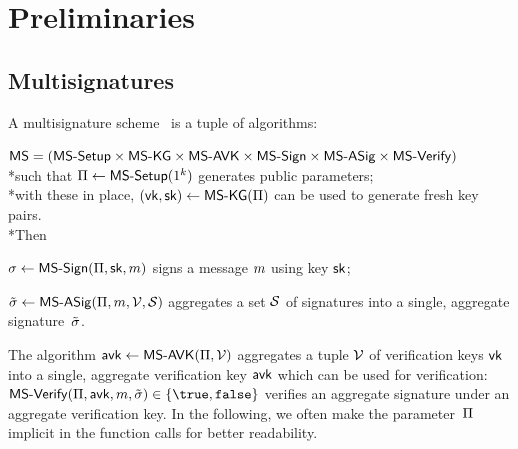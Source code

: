 \section{Preliminaries}\label{sec:prel}

\subsection{Multisignatures}\label{sec:multisig}
%
A multisignature scheme~\cite{itakura1983public,CCS:MicOhtRey01} is a
tuple of algorithms:

\vspace{5mm}$\mathsf{MS} = (\mathsf{MS\textsf{-}{}Setup} \times \allowbreak\mathsf{MS\textsf{-}{}KG} \times \allowbreak\mathsf{MS\textsf{-}{}AVK} \times \allowbreak
\mathsf{MS\textsf{-}{}Sign} \times \allowbreak\mathsf{MS\textsf{-}{}ASig} \times \allowbreak\mathsf{MS\textsf{-}{}Verify})$
\vspace{5mm}\\*such that
$\Pi \gets \mathsf{MS\textsf{-}{}Setup}(1^k)$ generates public parameters;
\\*with these in place,
$(\mathsf{vk},\mathsf{sk}) \gets \mathsf{MS\textsf{-}{}KG}(\Pi)$ can be used to generate
fresh key pairs. 
\vspace{5mm}\\*Then
\begin{mitemize}
  \item $\sigma \gets \mathsf{MS\textsf{-}{}Sign}(\Pi,\mathsf{sk},m)$ signs 
    a message $m$ using key $\mathsf{sk}$;
  \item $\tilde \sigma \gets \mathsf{MS\textsf{-}{}ASig}(\Pi,m,\mathcal V,\mathcal S)$ aggregates a
    set $\mathcal S$ of signatures into a single, aggregate signature~$\tilde \sigma$.
  \end{mitemize}
  The algorithm $\mathsf{avk} \gets \mathsf{MS\textsf{-}{}AVK}(\Pi,\mathcal V)$ aggregates
  a tuple $\mathcal V$ of verification keys $\mathsf{vk}$ into a single,
  aggregate verification key $\mathsf{avk}$ which can be used for verification:
  $\msVfy(\msParams,\msCVK,\msMsg,\msCSig) \in \{\true,\false\}$
  verifies an aggregate signature under an aggregate verification key.
  In the following, we often make the parameter~$\Pi$ implicit in the
    function calls for better readability.

